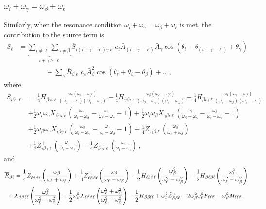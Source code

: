 \documentclass[letterpaper,11pt]{article}
\newcommand{\oi}{\omega_i}
\newcommand{\ol}{\omega_\ell}
\newcommand{\obet}{\omega_{\beta}}
\newcommand{\ogam}{\omega_\gamma}
\begin{document}
\subsubsection{$\oi + \ogam = \obet + \ol$}
\label{ssec: intpluschi2}

Similarly, when the resonance condition $\oi + \ogam = \obet + \ol$ is met, the contribution to the source term is
\begin{align}
\label{intpluschi2 source}
S_\ell &= \underbrace{\sum_{i \neq \ell} \sum_{\gamma \neq \beta}}_{i + \gamma \geq \ell} \overline{S}_{i (i + \gamma - \ell) \gamma \ell} \, a_i \bar A_{(i + \gamma - \ell)} \bar A_\gamma \cos \left( \theta_i - \theta_{(i + \gamma - \ell)}  + \theta_\gamma \right) \nonumber \\
%
& \qquad \qquad + \sum_\beta \overline{R}_{\beta\ell} \, a_\ell \bar A_\beta^2 \cos \left( \theta_\ell + \theta_\beta - \theta_\beta \right) + \ldots \, ,
\end{align}
where
\begin{align}
\overline{S}_{i\beta\gamma\ell} &= \frac{1}{4} H_{\beta\gamma i\ell} \frac{\ogam (\oi - \obet)}{(\obet - \ogam)(\oi - \ogam)} - \frac{1}{4} H_{\gamma\beta i \ell} \frac{\obet(\ol - \obet)}{(\obet - \ogam)(\oi - \obet)} + \frac{1}{4} H_{\beta i \gamma\ell} \frac{\oi (\ogam - \obet)}{(\oi - \obet)(\oi - \ogam)} \nonumber \\
%
& + \frac{1}{2} \oi \ogam X_{\beta\gamma i \ell} \left( \frac{\ogam}{\oi - \obet} - \frac{\oi}{\obet - \ogam} + 1 \right) + \frac{1}{2} \oi \obet X_{\gamma\beta i \ell} \left( \frac{\oi}{\obet - \ogam} - \frac{\obet}{\oi - \ogam} - 1 \right) \nonumber \\
%
& + \frac{1}{2} \obet \ogam X_{i\beta\gamma\ell} \left( \frac{\obet}{\oi - \ogam} - \frac{\ogam}{\oi - \obet} - 1 \right)  + \frac{1}{4} Z^-_{i\gamma\beta\ell} \left( \frac{\obet}{\ol + \obet}\right)  \nonumber \\
%
&
+ \frac{1}{4} Z^+_{i\beta\gamma\ell} \left( \frac{\ogam}{\ol - \ogam}\right) - \frac{1}{4}Z^+_{\beta\gamma i \ell} \left( \frac{\oi}{\oi - \ol} \right) \, ,
\end{align}
and
\begin{align}
\overline{R}_{\beta\ell} &= \frac{1}{4} Z^-_{\ell\beta\beta\ell} \left( \frac{\obet}{\ol + \obet} \right) + \frac{1}{4} Z^+_{\ell\beta\beta\ell} \left( \frac{\obet}{\ol - \obet} \right) + \frac{1}{2} H_{\ell\beta\beta\ell} \left( \frac{\obet^2}{\ol^2 - \obet^2} \right) - \frac{1}{2} H_{\beta\ell\beta\ell} \left( \frac{\ol^2}{\ol^2 - \obet^2} \right) \nonumber \\
%
& \!\!\!\!\!\!\!\! + X_{\beta\beta\ell\ell} \left( \frac{\ol^2}{\ol^2 - \obet^2} \right) + \frac{1}{2} \obet^2 X_{\ell\beta\beta\ell} \left( \frac{\ol^2 + \obet^2}{\ol^2 - \obet^2} \right) - \frac{1}{2} H_{\beta\beta\ell\ell} +  \ol^2 \tilde{Z}^+_{\beta\beta\ell} - 2 \obet^2 \ol^2 P_{\ell\ell\beta} - \obet^2 M_{\ell\ell\beta} \vspace{-0.3in}
\end{align}
\end{document}
